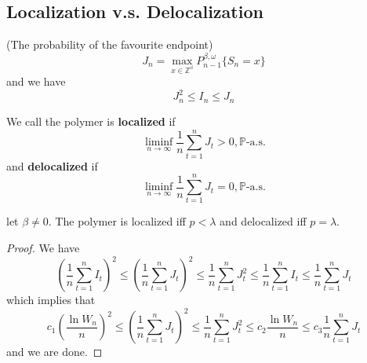 \subsection{Localization v.s. Delocalization}

\begin{definition}
    (The probability of the favourite endpoint)
    \[
    J_n = \max_{x\in\mathbb{Z^d}}P_{n-1}^{\beta,\omega}\{S_n = x\}
    \]
    and we have
    \[
    J_n^2 \leq I_n \leq J_n
    \]
\end{definition}

\begin{definition}
    We call the polymer is \textbf{localized} if
    \[
    \liminf_{n\to\infty}\dfrac{1}{n}\sum\limits_{t=1}^n J_t > 0,\mathbb{P}\text{-a.s.}
    \]
    and \textbf{delocalized} if
    \[
    \liminf_{n\to\infty}\dfrac{1}{n}\sum\limits_{t=1}^n J_t = 0,\mathbb{P}\text{-a.s.}
    \]
\end{definition}

\begin{theorem}
    let $\beta \neq 0$. The polymer is localized iff $p<\lambda$ and delocalized iff $p=\lambda$.
\end{theorem}
\begin{proof}
    We have
    \[
    \left(\dfrac{1}{n}\sum\limits_{t=1}^n I_t\right)^2 \leq \left(\dfrac{1}{n}\sum\limits_{t=1}^n J_t\right)^2 \leq \dfrac{1}{n}\sum\limits_{t=1}^n J_t^2 \leq \dfrac{1}{n}\sum\limits_{t=1}^n I_t \leq \dfrac{1}{n}\sum\limits_{t=1}^n J_t
    \]
    which implies that
    \[
    c_1\left(\dfrac{\ln W_n}{n}\right)^2 \leq \left(\dfrac{1}{n}\sum\limits_{t=1}^n J_t\right)^2 \leq \dfrac{1}{n}\sum\limits_{t=1}^n J_t^2 \leq c_2 \dfrac{\ln W_n}{n} \leq c_3 \dfrac{1}{n}\sum\limits_{t=1}^n J_t
    \]
    and we are done.
\end{proof}

